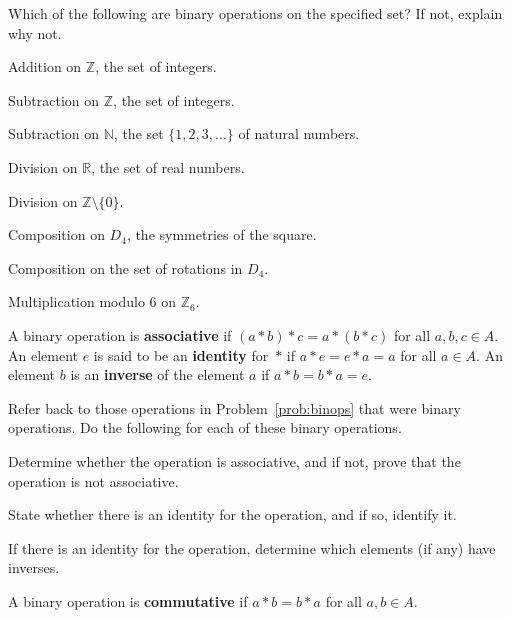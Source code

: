 \begin{problem}\label{prob:binops}
Which of the following are binary operations on the specified set? If not, explain why not.
\begin{problemparts}
  \item Addition on \(\mathbb{Z}\), the set of integers.
  \item Subtraction on \(\mathbb{Z}\), the set of integers.
  \item Subtraction on \(\mathbb{N}\), the set \(\{1,2,3,\ldots\}\) of natural numbers.
  \item Division on \(\mathbb{R}\), the set of real numbers.
  \item Division on \(\mathbb{Z}\setminus \{0\}\).
  \item Composition on \(D_4\), the symmetries of the square.
  \item Composition on the set of rotations in \(D_4\).
  \item Multiplication modulo 6 on \(\mathbb{Z}_6\).
\end{problemparts}
\end{problem}

\begin{definition}
A binary operation is \textbf{associative} if \((a * b)*c = a*(b*c)\) for all \(a,b,c \in A\).  An element \(e\) is said to be an \textbf{identity} for~\(*\) if \(a*e = e*a = a\) for all \(a \in A\).
An element \(b\) is an \textbf{inverse} of the element \(a\) if \(a * b = b * a = e\).
\end{definition}

\begin{problem}
Refer back to those operations in Problem~\ref{prob:binops} that were binary operations.
Do the following for each of these binary operations.
\begin{problemparts}
  \item Determine whether the operation is associative, and if not, prove that the operation is not associative.
  \item State whether there is an identity for the operation, and if so, identify it.
  \item If there is an identity for the operation, determine which elements (if any) have inverses.
\end{problemparts}
\end{problem}

\clearpage %

\begin{definition}
    A binary operation is \textbf{commutative} if \(a * b = b * a\) for all \(a,b \in A\).
\end{definition}

